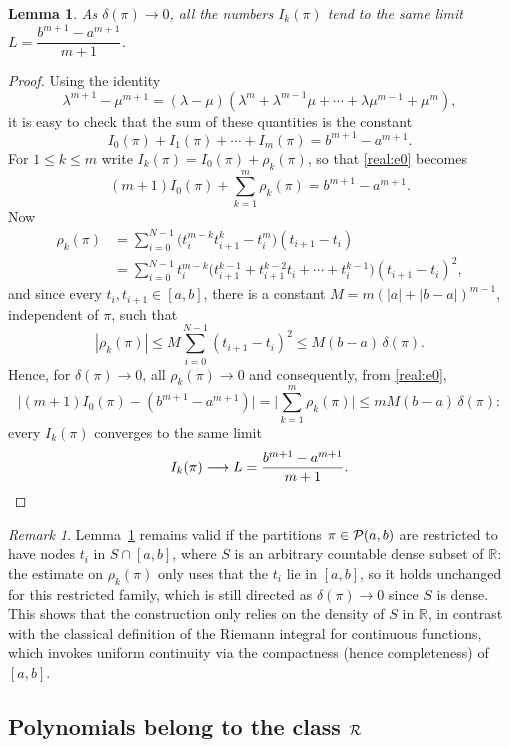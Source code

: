 \documentclass[11pt,fleqn]{article}
\def\R{\mathbb R}
\theoremstyle{plain}
\newtheorem{lemma}[thm]{Lemma}
\theoremstyle{remark}
\newtheorem{remark}[thm]{Remark}
\begin{document}
\begin{lemma}\label{lem:real1}
As $\delta(\pi)\to 0$, all the numbers $I_k(\pi)$ tend to the same limit
$L=\dfrac{b^{m+1}-a^{m+1}}{m+1}$.
\end{lemma}
\begin{proof}
Using the identity
\[
\lambda^{m+1}-\mu^{m+1}=(\lambda-\mu)(\lambda^m+\lambda^{m-1}\mu+\cdots+
\lambda\mu^{m-1}+\mu^m),
\]
it is easy to check that the sum of these quantities is the constant
\begin{equation}\label{real:e0}
I_0(\pi)+I_1(\pi)+\cdots+I_m(\pi)=b^{m+1}-a^{m+1}.
\end{equation}
For $1\le k\le m$ write $I_k(\pi)=I_0(\pi)+\rho_k(\pi)$, so that
\eqref{real:e0} becomes
\[
(m+1)I_0(\pi)+\sum_{k=1}^m\rho_k(\pi)=b^{m+1}-a^{m+1}.
\]
Now
\begin{align*}
\rho_k(\pi)&=\sum_{i=0}^{N-1}\big(t_i^{m-k}t_{i+1}^k-t_i^m\big)(t_{i+1}-t_i)\\
&=\sum_{i=0}^{N-1}t_i^{m-k}\big(t_{i+1}^{k-1}+t_{i+1}^{k-2}t_i+\cdots+t_i^{k-1}\big)(t_{i+1}-t_i)^2,
\end{align*}
and since every $t_i,t_{i+1}\in[a,b]$, there is a constant
$M=m(|a|+|b-a|)^{m-1}$, independent of $\pi$, such that
\[
|\rho_k(\pi)|\le M\sum_{i=0}^{N-1}(t_{i+1}-t_i)^2\le M(b-a)\,\delta(\pi).
\]
Hence, for $\delta(\pi)\to0$, all $\rho_k(\pi)\to0$ and consequently, from
\eqref{real:e0},
\[
\big|(m+1)I_0(\pi)-(b^{m+1}-a^{m+1})\big|
=\Big|\sum_{k=1}^m\rho_k(\pi)\Big|\le mM(b-a)\,\delta(\pi):
\]
every $I_k(\pi)$ converges to the same limit
\[
I_k(\pi)\longrightarrow L=\frac{b^{m+1}-a^{m+1}}{m+1}. \qedhere
\]
\end{proof}

\begin{remark}\label{rem:dense}
Lemma~\ref{lem:real1} remains valid if the partitions $\pi\in{\cal P}(a,b)$
are restricted to have nodes $t_i$ in $S\cap[a,b]$, where $S$ is an
arbitrary countable dense subset of $\R$: the estimate on $\rho_k(\pi)$
only uses that the $t_i$ lie in $[a,b]$, so it holds unchanged for this
restricted family, which is still directed as $\delta(\pi)\to0$ since $S$
is dense. This shows that the construction only relies on the density of
$S$ in $\R$, in contrast with the classical definition of the Riemann
integral for continuous functions, which invokes uniform continuity via
the compactness (hence completeness) of $[a,b]$.
\end{remark}

\subsection{Polynomials belong to the class ${\cal R}$}
\end{document}
